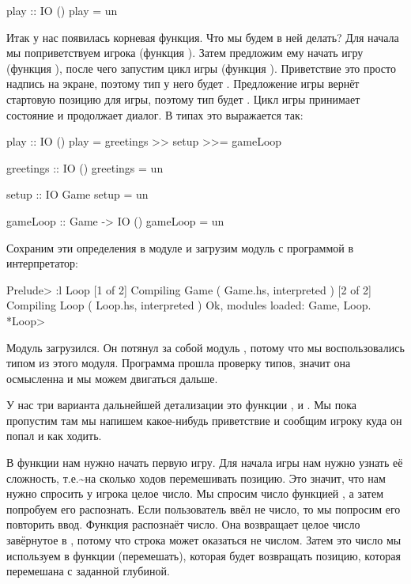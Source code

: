 \begin{code}
play :: IO ()
play = un
\end{code}

Итак у нас появилась корневая функция. Что мы будем в ней делать? Для
начала мы поприветствуем игрока (функция ). Затем
предложим ему начать игру (функция ), после чего запустим цикл
игры (функция ). Приветствие это просто надпись на экране,
поэтому тип у него будет . Предложение игры вернёт стартовую
позицию для игры, поэтому тип будет . Цикл игры принимает
состояние и продолжает диалог. В типах это выражается так:


\begin{code}
play :: IO ()
play = greetings >> setup >>= gameLoop

greetings :: IO ()
greetings = un

setup :: IO Game
setup = un

gameLoop :: Game -> IO ()
gameLoop = un
\end{code}

Сохраним эти определения в модуле  и загрузим модуль с
программой в интерпретатор:


\begin{code}
Prelude> :l Loop
[1 of 2] Compiling Game             ( Game.hs, interpreted )
[2 of 2] Compiling Loop             ( Loop.hs, interpreted )
Ok, modules loaded: Game, Loop.
*Loop> 
\end{code}

Модуль загрузился. Он потянул за собой модуль , потому что мы
воспользовались типом  из этого модуля. Программа прошла
проверку типов, значит она осмысленна и мы можем двигаться дальше.

У нас три варианта дальнейшей детализации это функции ,
 и . Мы пока пропустим  там мы
напишем какое-нибудь приветствие и сообщим игроку куда он попал и как
ходить.

В функции  нам нужно начать первую игру. Для начала игры нам
нужно узнать её сложность, т.е.\textasciitilde{}на сколько ходов
перемешивать позицию. Это значит, что нам нужно спросить у игрока целое
число. Мы спросим число функцией , а затем попробуем его
распознать. Если пользователь ввёл не число, то мы попросим его
повторить ввод. Функция  распознаёт
число. Она возвращает целое число завёрнутое в , потому что
строка может оказаться не числом. Затем это число мы используем в
функции  (перемешать), которая будет возвращать позицию,
которая перемешана с заданной глубиной.


